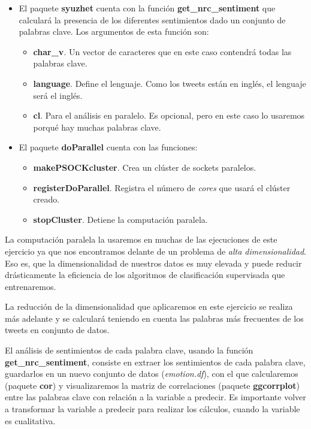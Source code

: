 \documentclass[]{article}
\providecommand{\tightlist}{%
  \setlength{\itemsep}{0pt}\setlength{\parskip}{0pt}}
\begin{document}
\begin{itemize}
\tightlist
\item
  El paquete \textbf{syuzhet} cuenta con la función
  \textbf{get\_nrc\_sentiment} que calculará la presencia de los
  diferentes sentimientos dado un conjunto de palabras clave. Los
  argumentos de esta función son:

  \begin{itemize}
  \tightlist
  \item
    \textbf{char\_v}. Un vector de caracteres que en este caso contendrá
    todas las palabras clave.
  \item
    \textbf{language}. Define el lenguaje. Como los tweets están en
    inglés, el lenguaje será el inglés.
  \item
    \textbf{cl}. Para el análisis en paralelo. Es opcional, pero en este
    caso lo usaremos porqué hay muchas palabras clave.
  \end{itemize}
\item
  El paquete \textbf{doParallel} cuenta con las funciones:

  \begin{itemize}
  \tightlist
  \item
    \textbf{makePSOCKcluster}. Crea un clúster de sockets paralelos.
  \item
    \textbf{registerDoParallel}. Registra el número de \emph{cores} que
    usará el clúster creado.
  \item
    \textbf{stopCluster}. Detiene la computación paralela.
  \end{itemize}
\end{itemize}

La computación paralela la usaremos en muchas de las ejecuciones de este
ejercicio ya que nos encontramos delante de un problema de \emph{alta
dimensionalidad}. Eso es, que la dimensionalidad de nuestros datos es
muy elevada y puede reducir drásticamente la eficiencia de los
algoritmos de clasificación supervisada que entrenaremos.

La reducción de la dimensionalidad que aplicaremos en este ejercicio se
realiza más adelante y se calculará teniendo en cuenta las palabras más
frecuentes de los tweets en conjunto de datos.

El análisis de sentimientos de cada palabra clave, usando la función
\textbf{get\_nrc\_sentiment}, consiste en extraer los sentimientos de
cada palabra clave, guardarlos en un nuevo conjunto de datos
(\emph{emotion.df}), con el que calcularemos (paquete \textbf{cor}) y
visualizaremos la matriz de correlaciones (paquete \textbf{ggcorrplot})
entre las palabras clave con relación a la variable a predecir. Es
importante volver a transformar la variable a predecir para realizar los
cálculos, cuando la variable es cualitativa.
\end{document}
